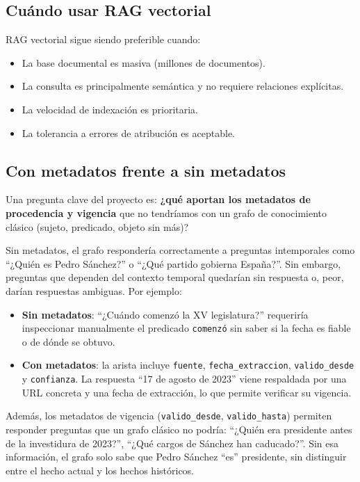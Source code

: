 \documentclass[12pt,a4paper]{article}
\begin{document}
\subsection{Cuándo usar RAG vectorial}

RAG vectorial sigue siendo preferible cuando:

\begin{itemize}
  \item La base documental es masiva (millones de documentos).
  \item La consulta es principalmente semántica y no requiere relaciones explícitas.
  \item La velocidad de indexación es prioritaria.
  \item La tolerancia a errores de atribución es aceptable.
\end{itemize}

\subsection{Con metadatos frente a sin metadatos}

Una pregunta clave del proyecto es: \textbf{¿qué aportan los metadatos de procedencia y vigencia} que no tendríamos con un grafo de conocimiento clásico (sujeto, predicado, objeto sin más)?

Sin metadatos, el grafo respondería correctamente a preguntas intemporales como ``¿Quién es Pedro Sánchez?'' o ``¿Qué partido gobierna España?''. Sin embargo, preguntas que dependen del contexto temporal quedarían sin respuesta o, peor, darían respuestas ambiguas. Por ejemplo:

\begin{itemize}
  \item \textbf{Sin metadatos}: ``¿Cuándo comenzó la XV legislatura?'' requeriría inspeccionar manualmente el predicado \texttt{comenzó} sin saber si la fecha es fiable o de dónde se obtuvo.
  \item \textbf{Con metadatos}: la arista incluye \texttt{fuente}, \texttt{fecha\_extraccion}, \texttt{valido\_desde} y \texttt{confianza}. La respuesta ``17 de agosto de 2023'' viene respaldada por una URL concreta y una fecha de extracción, lo que permite verificar su vigencia.
\end{itemize}

Además, los metadatos de vigencia (\texttt{valido\_desde}, \texttt{valido\_hasta}) permiten responder preguntas que un grafo clásico no podría: ``¿Quién era presidente antes de la investidura de 2023?'', ``¿Qué cargos de Sánchez han caducado?''. Sin esa información, el grafo solo sabe que Pedro Sánchez ``es'' presidente, sin distinguir entre el hecho actual y los hechos históricos.
\end{document}
